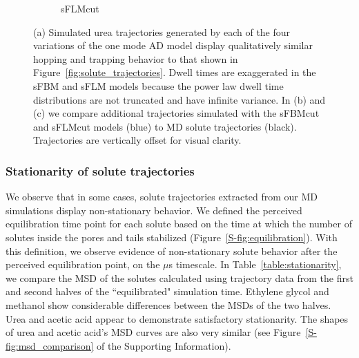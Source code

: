 \documentclass[journal=jctcce,manuscript=article]{achemso}
\begin{document}
\begin{figure}
\begin{subfigure}{0.325\textwidth}
  \caption{sFLMcut}\label{fig:ad_realizations_sFLMcut_stacked}
  \end{subfigure}
  \caption{(a) Simulated urea trajectories generated by each of the four
	  variations of the one mode AD model display qualitatively similar
	  hopping and trapping behavior to that shown in
	  Figure~\ref{fig:solute_trajectories}. Dwell times are exaggerated in
	  the sFBM and sFLM models because the power law dwell time
	  distributions are not truncated and have infinite variance. In (b)
	  and (c) we compare additional trajectories simulated with the sFBMcut
	  and sFLMcut models (blue) to MD solute trajectories (black).
	  Trajectories are vertically offset for visual clarity.
  }\label{fig:ad_eyetest}
  \end{figure}
    
  \subsubsection{Stationarity of solute trajectories}\label{section:stationarity}

  We observe that in some cases, solute trajectories extracted from our MD
  simulations display non-stationary behavior. We defined the perceived
  equilibration time point for each solute based on the time at which the
  number of solutes inside the pores and tails stabilized
  (Figure~\ref{S-fig:equilibration}).  With this definition, we observe
  evidence of non-stationary solute behavior after the perceived equilibration
  point, on the $\mu$s timescale. In Table~\ref{table:stationarity}, we compare
  the MSD of the solutes calculated using trajectory data from the first and
  second halves of the ``equilibrated" simulation time. Ethylene glycol and
  methanol show considerable differences between the MSDs of the two halves.
  Urea and acetic acid appear to demonstrate satisfactory stationarity. The
  shapes of urea and acetic acid's MSD curves are also very similar (see
  Figure~\ref{S-fig:msd_comparison} of the Supporting Information).
  
\end{document}
